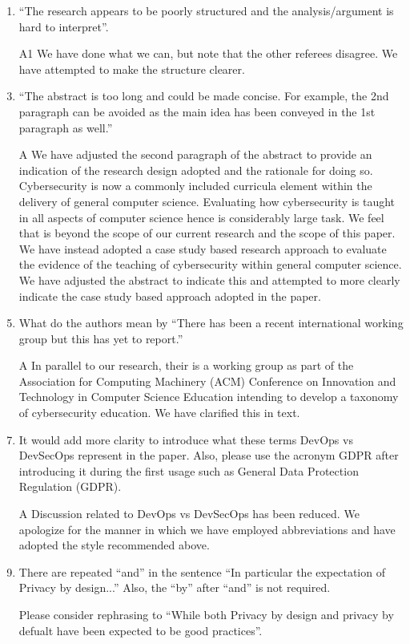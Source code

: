 \documentclass{article}
\begin{document}
\begin{enumerate}
\item ``The research appears to be poorly structured and the analysis/argument is hard to interpret''.
\item[A1]We have done what we can, but note that the other referees disagree. We have attempted to make the structure clearer.
\item ``The abstract is too long and could be made concise. For example, the 2nd paragraph can be avoided as the main idea has been conveyed in the 1st paragraph as well.''
\item[A]We have adjusted the second paragraph of the abstract to provide an indication of the research design adopted and the rationale for doing so. Cybersecurity is now a commonly included curricula element within the delivery of general computer science. Evaluating how cybersecurity is taught in all aspects of computer science hence is considerably large task. We feel that is beyond the scope of our current research and the scope of this paper. We have instead adopted a case study based research approach to evaluate the evidence of the teaching of cybersecurity within general computer science. We have adjusted the abstract to indicate this and attempted to more clearly indicate the case study based approach adopted in the paper.
\item What do the authors mean by ``There has been a recent international working group but this has yet to report.'' 
\item[A] In parallel to our research, their is a working group as part of the Association for Computing Machinery (ACM) Conference on Innovation and Technology in Computer Science Education intending to develop a taxonomy of cybersecurity education. We have clarified this in text.
\item It would add more clarity to introduce what these terms DevOps vs DevSecOps represent in the paper. Also, please use the acronym GDPR after introducing it during the first usage such as General Data Protection Regulation (GDPR). 
\item[A] Discussion related to DevOps vs DevSecOps has been reduced. We apologize for the manner in which we have employed abbreviations and have adopted the style recommended above.
\item There are repeated ``and'' in the sentence ``In particular the expectation of Privacy by design...'' Also, the ``by'' after ``and'' is not required. 

Please consider rephrasing to ``While both Privacy by design and privacy by defualt have been expected to be good practices''.


\end{enumerate}
\end{document}
